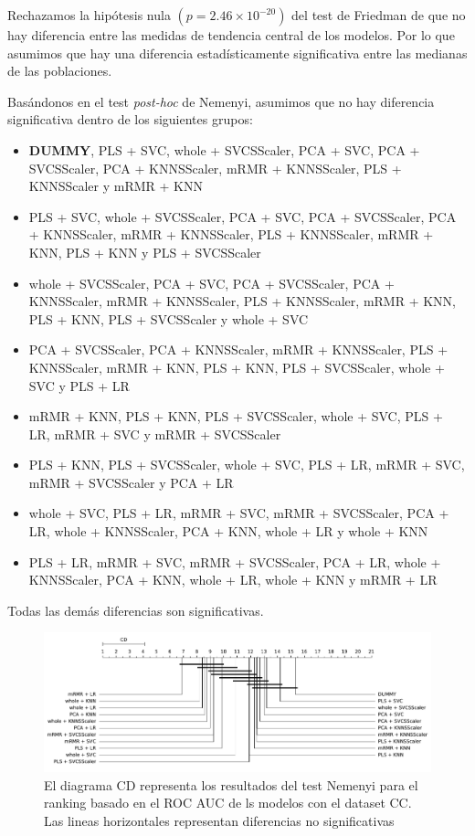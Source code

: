 \documentclass[a4paper,oneside,11pt,leqno]{article}
\begin{document}
	Rechazamos la hipótesis nula $(p=2.46\times 10^{-20})$ del test de Friedman de que no hay diferencia entre las medidas de tendencia central de los modelos. Por lo que asumimos que hay una diferencia estadísticamente significativa entre las medianas de las poblaciones.

	Basándonos en el test \textit{post-hoc} de Nemenyi, asumimos que no hay diferencia significativa dentro de los siguientes grupos:

	\begin{itemize}
		\item  \textbf{DUMMY}, PLS + SVC, whole + SVCSScaler, PCA + SVC, PCA + SVCSScaler, PCA + KNNSScaler, mRMR + KNNSScaler, PLS + KNNSScaler y mRMR + KNN

		\item PLS + SVC, whole + SVCSScaler, PCA + SVC, PCA + SVCSScaler, PCA + KNNSScaler, mRMR + KNNSScaler, PLS + KNNSScaler, mRMR + KNN, PLS + KNN y PLS + SVCSScaler

		\item whole + SVCSScaler, PCA + SVC, PCA + SVCSScaler, PCA + KNNSScaler, mRMR + KNNSScaler, PLS + KNNSScaler, mRMR + KNN, PLS + KNN, PLS + SVCSScaler y whole + SVC

		\item PCA + SVCSScaler, PCA + KNNSScaler, mRMR + KNNSScaler, PLS + KNNSScaler, mRMR + KNN, PLS + KNN, PLS + SVCSScaler, whole + SVC y PLS + LR

		\item mRMR + KNN, PLS + KNN, PLS + SVCSScaler, whole + SVC, PLS + LR, mRMR + SVC y mRMR + SVCSScaler

		\item PLS + KNN, PLS + SVCSScaler, whole + SVC, PLS + LR, mRMR + SVC, mRMR + SVCSScaler y PCA + LR

		\item  whole + SVC, PLS + LR, mRMR + SVC, mRMR + SVCSScaler, PCA + LR, whole + KNNSScaler, PCA + KNN, whole + LR y whole + KNN

		\item  PLS + LR, mRMR + SVC, mRMR + SVCSScaler, PCA + LR, whole + KNNSScaler, PCA + KNN, whole + LR, whole + KNN y mRMR + LR

	\end{itemize}
	Todas las demás diferencias son significativas.

	\begin{figure}[h]
		\includegraphics[width=\linewidth]{stat_results_cc.pdf}
		\caption{El diagrama CD representa los resultados del test Nemenyi para el ranking basado en el ROC AUC de ls modelos con el dataset CC. Las lineas horizontales representan diferencias no significativas}
		\label{fig:stats_fig_cc}
	\end{figure}
\end{document}
